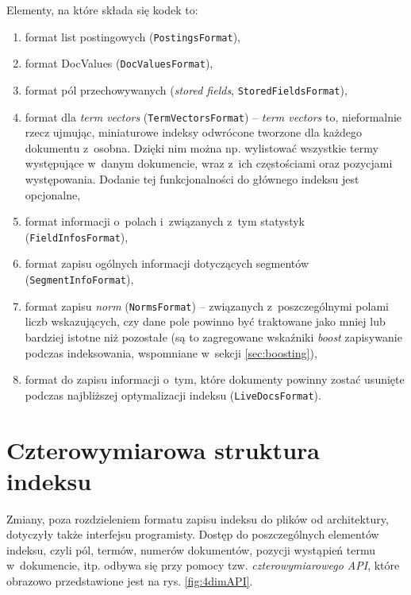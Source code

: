 Elementy, na które składa się kodek to:
\begin{enumerate}
 \item format list postingowych (\texttt{PostingsFormat}),
 \item format DocValues (\texttt{DocValuesFormat}),
 \item format pól przechowywanych (\emph{stored fields}, \texttt{StoredFieldsFormat}),
 \item format dla \emph{term vectors} (\texttt{TermVectorsFormat}) -- \emph{term vectors} to, nieformalnie rzecz ujmując, miniaturowe indeksy odwrócone tworzone dla każdego dokumentu z~osobna. Dzięki nim można np. wylistować wszystkie termy występujące w~danym dokumencie, wraz z~ich częstościami oraz pozycjami występowania. Dodanie tej funkcjonalności do głównego indeksu jest opcjonalne,
 \item format informacji o~polach i~związanych z~tym statystyk (\texttt{FieldInfosFormat}),
 \item format zapisu ogólnych informacji dotyczących segmentów (\texttt{SegmentInfoFormat}),
 \item format zapisu \emph{norm} (\texttt{NormsFormat}) -- związanych z~poszczególnymi polami liczb wskazujących, czy dane pole powinno być traktowane jako mniej lub bardziej istotne niż pozostałe (są to zagregowane wskaźniki \emph{boost} zapisywanie podczas indeksowania, wspomniane w~sekcji \ref{sec:boosting}),
 \item format do zapisu informacji o~tym, które dokumenty powinny zostać usunięte podczas najbliższej optymalizacji indeksu (\texttt{LiveDocsFormat}).
\end{enumerate}

\section{Czterowymiarowa struktura indeksu}
\label{sec:4dimAPI}

Zmiany, poza rozdzieleniem formatu zapisu indeksu do plików od architektury, dotyczyły także interfejsu programisty. Dostęp do poszczególnych elementów indeksu, czyli pól, termów, numerów dokumentów, pozycji wystąpień termu w~dokumencie, itp. odbywa się przy pomocy tzw. \emph{czterowymiarowego API}, które obrazowo przedstawione jest na rys. \ref{fig:4dimAPI}.


